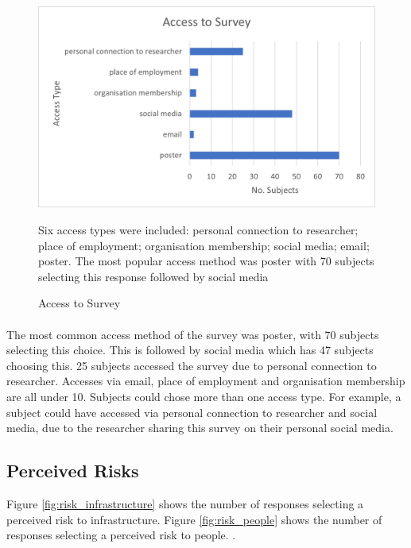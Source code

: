 \begin{figure}[H]
    \centering
    \includegraphics{fig_results/access_survey.png}
    \caption{Access to Survey}{ Six access types were included: personal connection to researcher; place of employment; organisation membership; social media; email; poster. The most popular access method was poster with 70 subjects selecting this response followed by social media}
    \label{fig:survey_access}
\end{figure}
\paragraph{}


The most common access method of the survey was poster, with 70 subjects selecting this choice. This is followed by social media which has 47 subjects choosing this. 25 subjects accessed the survey due to personal connection to researcher. Accesses via email, place of employment and organisation membership are all under 10. Subjects could chose more than one access type. For example, a subject could have accessed via personal connection to researcher and social media, due to the researcher sharing this survey on their personal social media.  
\paragraph{}



\subsection{Perceived Risks}
Figure \ref{fig:risk_infrastructure} shows the  number of responses selecting a perceived risk to infrastructure. Figure \ref{fig:risk_people} shows the number of responses selecting a perceived risk to people. .

